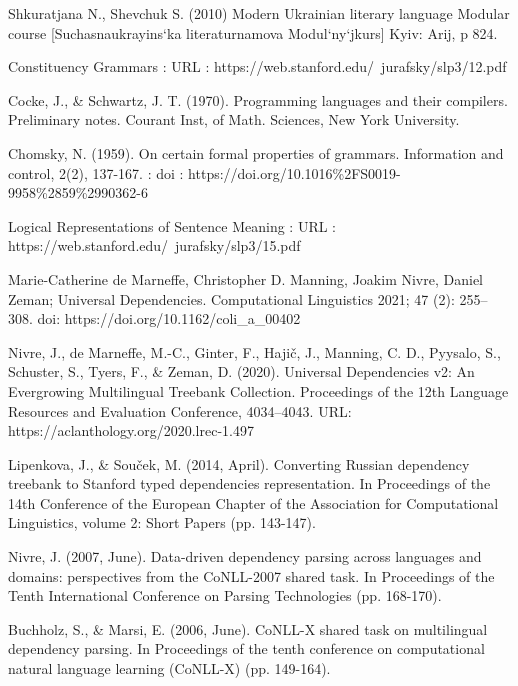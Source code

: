 \begin{thebibliography}{99}
\pagestyle{empty}

{}

Shkuratjana N., Shevchuk S. (2010) Modern Ukrainian literary language Modular course [Suchasnaukrayins`ka
literaturnamova Modul`ny`jkurs] Kyiv: Arij, p 824.

Constituency Grammars : URL :
https://web.stanford.edu/~jurafsky/slp3/12.pdf

Cocke, J., \& Schwartz, J. T. (1970). Programming languages and their compilers. Preliminary notes. Courant Inst, of Math. Sciences, New York University.

Chomsky, N. (1959). On certain formal properties of grammars. Information and control, 2(2), 137-167. : doi : https://doi.org/10.1016\%2FS0019-9958\%2859\%2990362-6

Logical Representations of Sentence Meaning : URL :
https://web.stanford.edu/~jurafsky/slp3/15.pdf

Marie-Catherine de Marneffe, Christopher D. Manning, Joakim Nivre, Daniel Zeman;
Universal Dependencies. Computational Linguistics 2021; 47 (2): 255–308. doi:
https://doi.org/10.1162/coli\_a\_00402

Nivre, J., de Marneffe, M.-C., Ginter, F., Hajič, J., Manning, C. D., Pyysalo, S., Schuster, S., Tyers, F., \& Zeman, D. (2020). Universal Dependencies v2: An Evergrowing Multilingual Treebank Collection. Proceedings of the 12th Language Resources and Evaluation Conference, 4034–4043. URL: https://aclanthology.org/2020.lrec-1.497

Lipenkova, J., \& Souček, M. (2014, April). Converting Russian dependency treebank to Stanford typed dependencies representation. In Proceedings of the 14th Conference of the European Chapter of the Association for Computational Linguistics, volume 2: Short Papers (pp. 143-147).

Nivre, J. (2007, June). Data-driven dependency parsing across languages and domains: perspectives from the CoNLL-2007 shared task. In Proceedings of the Tenth International Conference on Parsing Technologies (pp. 168-170).

Buchholz, S., \& Marsi, E. (2006, June). CoNLL-X shared task on multilingual dependency parsing. In Proceedings of the tenth conference on computational natural language learning (CoNLL-X) (pp. 149-164).


\end{thebibliography}
